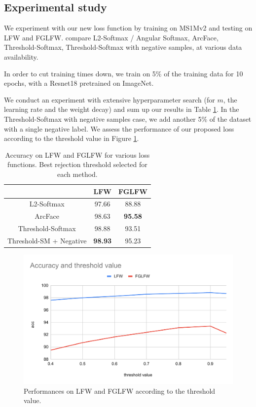\subsection{Experimental study}

We experiment with our new loss function by training on MS1Mv2 and testing on LFW and FGLFW. compare L2-Softmax / Angular Softmax, ArcFace, Threshold-Softmax, Threshold-Softmax with negative samples, at various data availability.

In order to cut training times down, we train on 5\% of the training data for 10 epochs, with a Resnet18 pretrained on ImageNet.

We conduct an experiment with extensive hyperparameter search (for $m$, the learning rate and the weight decay) and sum up our results in Table \ref{tab:tsm-lfw}. In the Threshold-Softmax with negative samples case, we add another 5\% of the dataset with a single negative label. We assess the performance of our proposed loss according to the threshold value in Figure \ref{fig:tsm-angle}.

\begin{table}[]
    \centering
    \begin{tabular}{|c|c|c|}
        \hline
         & LFW & FGLFW \\
        \hline
        L2-Softmax & 97.66 & 88.88 \\
        \hline
        ArcFace & 98.63 & \textbf{95.58} \\
        \hline
        Threshold-Softmax & 98.88 & 93.51 \\
        \hline
        Threshold-SM + Negative & \textbf{98.93} & 95.23 \\
        \hline
    \end{tabular}
    \caption{Accuracy on LFW and FGLFW for various loss functions. Best rejection threshold selected for each method.}
    \label{tab:tsm-lfw}
\end{table}

\begin{figure}
    \centering
    \includegraphics[width=\columnwidth]{50-files/tsm-angle.pdf}
    \caption{Performances on LFW and FGLFW according to the threshold value.}
    \label{fig:tsm-angle}
\end{figure}

